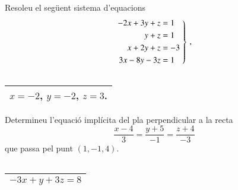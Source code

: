 \documentclass[11pt,catalan]{article}
\begin{document}
\begin{enunciat}
Resoleu el següent sistema d'equacions
\[
  \left.\aligned - 2 x + 3 y + z &= 1 \\ y + z &= 1 \\ x + 2 y + z &= -3 \\ 3 x - 8 y - 3 z &= 1 \endaligned\;\right\}\,,
\]
\end{enunciat}

\begin{quadricula}
\begin{tabular}{|C{5cm}{0.5cm}|}
\hline
  \\
\hline
\end{tabular}
\end{quadricula}

\begin{solucio}
\begin{center}
\begin{tabular}{|C{5cm}{0.5cm}|}
\hline
$x=-2$, $y=-2$, $z=3$. \\
\hline
\end{tabular}
\end{center}
\end{solucio}


\begin{enunciat}
Determineu l'equació implícita del pla perpendicular a la recta 
\[
  \frac{x - 4}{3} = \frac{y + 5}{-1} = \frac{z + 4}{-3}
\]
que passa pel punt $(1,-1,4)$.
\end{enunciat}

\begin{quadricula}
\begin{tabular}{|C{5cm}{0.5cm}|}
\hline
  \\
\hline
\end{tabular}
\end{quadricula}

\begin{solucio}
\begin{center}
\begin{tabular}{|C{5cm}{0.5cm}|}
\hline
$- 3 x + y + 3 z = 8$ \\
\hline
\end{tabular}
\end{center}
\end{solucio}
\end{document}
